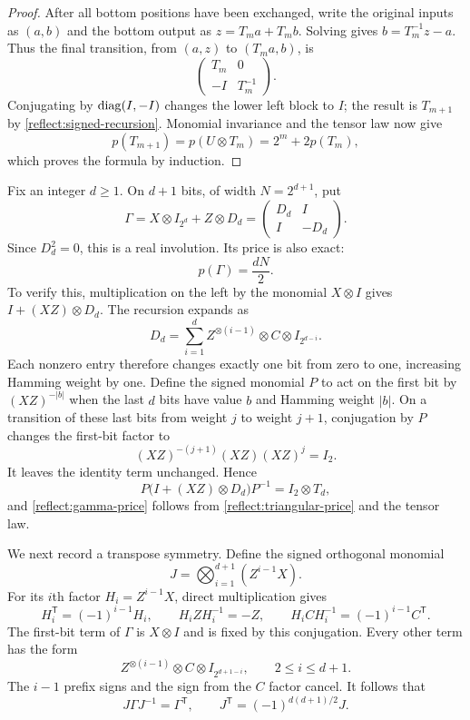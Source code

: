 \begin{proof}
After all bottom positions have been exchanged, write the original
inputs as $(a,b)$ and the bottom output as $z=T_ma+T_mb$.
Solving gives $b=T_m^{-1}z-a$.  Thus the final transition, from $(a,z)$
to $(T_ma,b)$, is
\[
 \begin{pmatrix}T_m&0\\-I&T_m^{-1}\end{pmatrix}.
\]
Conjugating by $\operatorname{diag}(I,-I)$ changes the lower left block to $I$;
the result is $T_{m+1}$ by \eqref{reflect:signed-recursion}.
Monomial invariance and the tensor law now give
\[
 p(T_{m+1})=p(U\otimes T_m)=2^m+2p(T_m),
\]
which proves the formula by induction.
\end{proof}

Fix an integer $d\geq1$.  On $d+1$ bits, of width $N=2^{d+1}$, put
\begin{equation}
 \Gamma=X\otimes I_{2^d}+Z\otimes D_d
       =\begin{pmatrix}D_d&I\\I&-D_d\end{pmatrix}.
 \label{reflect:gamma}
\end{equation}
Since $D_d^2=0$, this is a real involution.  Its price is also exact:
\begin{equation}
 p(\Gamma)=\frac{dN}{2}.
 \label{reflect:gamma-price}
\end{equation}
To verify this, multiplication on the left by the monomial
$X\otimes I$ gives $I+(XZ)\otimes D_d$.
The recursion expands as
\[
 D_d=\sum_{i=1}^d
       Z^{\otimes(i-1)}\otimes C\otimes I_{2^{d-i}}.
\]
Each nonzero entry therefore changes exactly one bit from zero to one,
increasing Hamming weight by one.  Define the signed monomial $P$ to
act on the first bit by $(XZ)^{-|b|}$ when the last $d$ bits have value
$b$ and Hamming weight $|b|$.  On a transition of these last bits from
weight $j$ to weight $j+1$, conjugation by $P$ changes the first-bit
factor to
\[
 (XZ)^{-(j+1)}(XZ)(XZ)^j=I_2.
\]
It leaves the identity term unchanged.  Hence
\[
 P\bigl(I+(XZ)\otimes D_d\bigr)P^{-1}=I_2\otimes T_d,
\]
and \eqref{reflect:gamma-price} follows from
\cref{reflect:triangular-price} and the tensor law.

We next record a transpose symmetry.  Define the signed orthogonal
monomial
\begin{equation}
 J=\bigotimes_{i=1}^{d+1}(Z^{i-1}X).
 \label{reflect:j-definition}
\end{equation}
For its $i$th factor $H_i=Z^{i-1}X$, direct multiplication gives
\[
 H_i^{\mathsf T}=(-1)^{i-1}H_i,\qquad
 H_iZH_i^{-1}=-Z,\qquad
 H_iCH_i^{-1}=(-1)^{i-1}C^{\mathsf T}.
\]
The first-bit term of $\Gamma$ is $X\otimes I$ and is fixed by this
conjugation.  Every other term has the form
\[
 Z^{\otimes(i-1)}\otimes C\otimes I_{2^{d+1-i}},
 \qquad 2\leq i\leq d+1.
\]
The $i-1$ prefix signs and the sign from the $C$ factor cancel.  It
follows that
\begin{equation}
 J\Gamma J^{-1}=\Gamma^{\mathsf T},\qquad
 J^{\mathsf T}=(-1)^{d(d+1)/2}J.
 \label{reflect:transpose-symmetry}
\end{equation}

